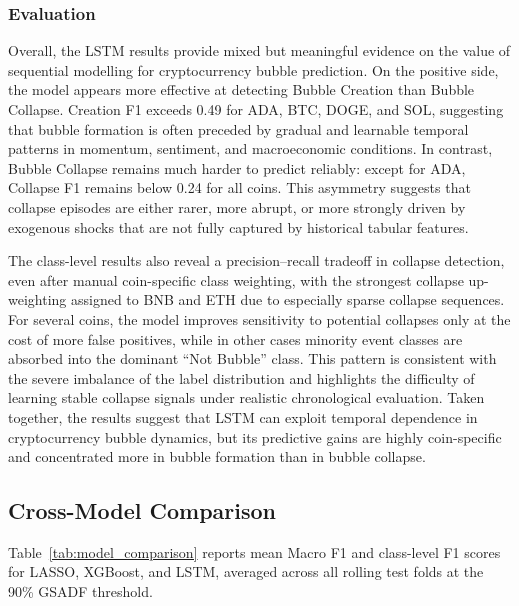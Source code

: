 \documentclass[12pt,a4paper]{article}
\begin{document}
\subsubsection{Evaluation}

Overall, the LSTM results provide mixed but meaningful evidence on the value of sequential modelling for cryptocurrency bubble prediction. On the positive side, the model appears more effective at detecting Bubble Creation than Bubble Collapse. Creation F1 exceeds 0.49 for ADA, BTC, DOGE, and SOL, suggesting that bubble formation is often preceded by gradual and learnable temporal patterns in momentum, sentiment, and macroeconomic conditions. In contrast, Bubble Collapse remains much harder to predict reliably: except for ADA, Collapse F1 remains below 0.24 for all coins. This asymmetry suggests that collapse episodes are either rarer, more abrupt, or more strongly driven by exogenous shocks that are not fully captured by historical tabular features.

The class-level results also reveal a precision–recall tradeoff in collapse detection, even after manual coin-specific class weighting, with the strongest collapse up-weighting assigned to BNB and ETH due to especially sparse collapse sequences. For several coins, the model improves sensitivity to potential collapses only at the cost of more false positives, while in other cases minority event classes are absorbed into the dominant “Not Bubble” class. This pattern is consistent with the severe imbalance of the label distribution and highlights the difficulty of learning stable collapse signals under realistic chronological evaluation. Taken together, the results suggest that LSTM can exploit temporal dependence in cryptocurrency bubble dynamics, but its predictive gains are highly coin-specific and concentrated more in bubble formation than in bubble collapse.


\subsection{Cross-Model Comparison}

Table~\ref{tab:model_comparison} reports mean Macro F1 and class-level F1 scores for LASSO, XGBoost, and LSTM, averaged across all rolling test folds at the 90\% GSADF threshold. 
\end{document}
